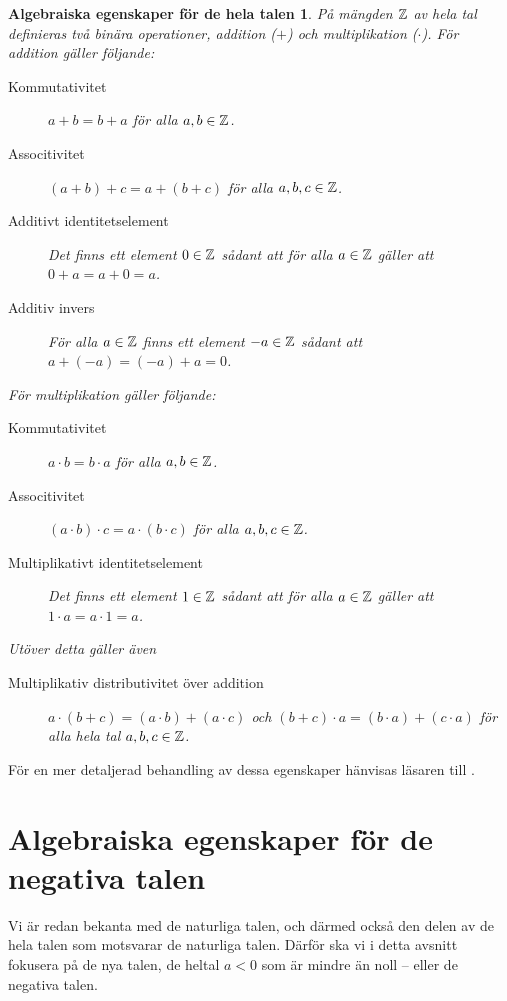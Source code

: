 \theoremstyle{plain}
\newtheorem*{AlgebraicPropertiesIntegers}{Algebraiska egenskaper för de hela
  talen}
\begin{AlgebraicPropertiesIntegers}\label{def:HeltalenEgenskaper}
  På mängden \(\mathbb{Z}\) av hela tal definieras två binära operationer,
  addition (\(+\)) och multiplikation (\(\cdot\)).
  För addition gäller följande:
  \begin{description}
    \item[Kommutativitet] \(a+b=b+a\) för alla \(a,b\in\mathbb{Z}\).
    \item[Associtivitet] \((a+b)+c=a+(b+c)\) för alla \(a,b,c\in\mathbb{Z}\).
    \item[Additivt identitetselement] Det finns ett element \(0\in\mathbb{Z}\)
      sådant att för alla \(a\in\mathbb{Z}\) gäller att \(0+a = a+0 = a\).
    \item[Additiv invers] För alla \(a\in\mathbb{Z}\) finns ett element \(-a\in\mathbb{Z}\)
      sådant att \(a + (-a) = (-a) + a = 0\).
  \end{description}
  För multiplikation gäller följande:
  \begin{description}
    \item[Kommutativitet] \(a \cdot b=b \cdot a\) för alla \(a,b\in\mathbb{Z}\).
    \item[Associtivitet] \((a \cdot b) \cdot c=a \cdot (b \cdot c)\) för
      alla \(a,b,c\in\mathbb{Z}\).
    \item[Multiplikativt identitetselement] Det finns ett element
      \(1\in\mathbb{Z}\) sådant att för alla \(a\in\mathbb{Z}\) gäller att
      \(1 \cdot a = a \cdot 1 = a\).
  \end{description}
  Utöver detta gäller även
  \begin{description}
    \item[Multiplikativ distributivitet över addition]
      \(a \cdot (b+c) = (a \cdot b) + (a \cdot c)\) och
      \((b+c) \cdot a = (b \cdot a) + (c \cdot a)\) för alla hela tal
      \(a,b,c\in\mathbb{Z}\).
  \end{description}
\end{AlgebraicPropertiesIntegers}

För en mer detaljerad behandling av dessa egenskaper hänvisas läsaren till 
\cite{Bartle2000itr,Grillet2007aa}.



\section{Algebraiska egenskaper för de negativa talen}
Vi är redan bekanta med de naturliga talen, och därmed också den
delen av de hela talen som motsvarar de naturliga talen.
Därför ska vi i detta avsnitt fokusera på de nya talen, de heltal \(a<0\) som
är mindre än noll -- eller de negativa talen.

